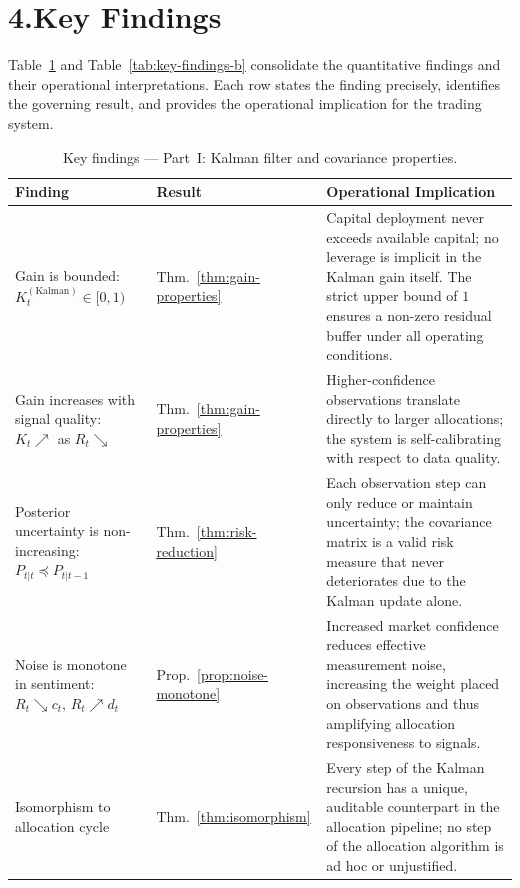\documentclass[12pt,openany]{book}
\numberwithin{equation}{chapter}
\theoremstyle{plain}
\theoremstyle{definition}
\theoremstyle{remark}
\begin{document}
\section*{4.\enspace Key Findings}

\noindent
Table~\ref{tab:key-findings-a} and Table~\ref{tab:key-findings-b}
consolidate the quantitative findings and their operational
interpretations.  Each row states the finding precisely, identifies
the governing result, and provides the operational implication for
the trading system.

\begin{table}[H]
\centering
\caption{Key findings --- Part~I: Kalman filter and
         covariance properties.}
\label{tab:key-findings-a}
\small
\begin{tabularx}{\linewidth}{@{} p{3.2cm} l X @{}}
\toprule
\textbf{Finding} & \textbf{Result} & \textbf{Operational
  Implication} \\
\midrule
Gain is bounded:
$K_t^{(\mathrm{Kalman})} \in [0,1)$
  & Thm.~\ref{thm:gain-properties}
  & Capital deployment never exceeds available capital;
    no leverage is implicit in the Kalman gain itself.
    The strict upper bound of $1$ ensures a non-zero
    residual buffer under all operating conditions. \\
\midrule
Gain increases with signal quality:
$K_t \nearrow$ as $R_t \searrow$
  & Thm.~\ref{thm:gain-properties}
  & Higher-confidence observations translate directly to
    larger allocations; the system is self-calibrating with
    respect to data quality. \\
\midrule
Posterior uncertainty is non-increasing:
$P_{t|t} \preceq P_{t|t-1}$
  & Thm.~\ref{thm:risk-reduction}
  & Each observation step can only reduce or maintain
    uncertainty; the covariance matrix is a valid risk
    measure that never deteriorates due to the Kalman update
    alone. \\
\midrule
Noise is monotone in sentiment:
$R_t \searrow c_t$, $R_t \nearrow d_t$
  & Prop.~\ref{prop:noise-monotone}
  & Increased market confidence reduces effective measurement
    noise, increasing the weight placed on observations and
    thus amplifying allocation responsiveness to signals.\\
\midrule
Isomorphism to allocation cycle
  & Thm.~\ref{thm:isomorphism}
  & Every step of the Kalman recursion has a unique,
    auditable counterpart in the allocation pipeline;
    no step of the allocation algorithm is ad hoc or
    unjustified. \\
\bottomrule
\end{tabularx}
\end{table}
\end{document}
